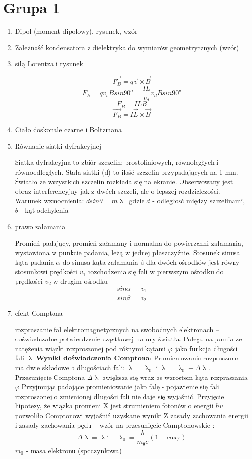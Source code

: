 \documentclass[12pt,a4paper]{article}
\begin{document}
	
	\section{Grupa 1}
	\begin {enumerate}
	
	
	\item Dipol (moment dipolowy), rysunek, wzór
	
	\item Zależność kondensatora z dielektryka do wymiarów geometrycznych (wzór)
	
	\item siłą Lorentza i rysunek
	
	$$\vec{F_B}=q\vec{v}\times\vec{B}$$
	$$F_B = qv_dBsin90^o=\frac{IL}{v_d}v_dBsin90^o$$
	$$F_B=ILB$$
	$$\vec{F_B}=I\vec{L}\times\vec{B}$$
	
	\item Ciało doskonale czarne i Boltzmana
	
	\item Równanie siatki dyfrakcyjnej
	
	Siatka dyfrakcyjna to zbiór szczelin: prostoliniowych, równoległych i równoodległych. Stała siatki (d) to ilość szczelin przypadających na 1 mm. Światło ze wszystkich szczelin rozkłada się na ekranie. Obserwowany jest obraz interferencyjny jak z dwóch szczeli, ale o lepszej rozdzielczości.
	Warunek wzmocnienia: $dsin\theta =m\uplambda$, gdzie $d$ - odległość między szczelinami, $\theta$ - kąt odchylenia
	
	\item prawo załamania
	
	Promień padający, promień załamany i normalna do powierzchni załamania, wystawiona w punkcie padania, leżą w jednej płaszczyźnie. Stosunek sinusa kąta padania $\alpha$ do sinusa kąta załamania $\beta$ dla dwóch ośrodków jest równy stosunkowi prędkości $v_1$ rozchodzenia się fali w pierwszym ośrodku do prędkości $v_2$ w drugim ośrodku
	$$\frac{sin\alpha}{sin\beta}=\frac{v_1}{v_2}$$
	
	\item efekt Comptona
	
	rozpraszanie fal elektromagnetycznych na swobodnych elektronach -- doświadczalne potwierdzenie cząstkowej natury światła. Polega na pomiarze natężenia wiązki rozproszonej pod różnymi kątami $\varphi$ jako funkcja długości fali $\uplambda$
	\textbf{Wyniki doświadczenia Comptona}: Promieniowanie rozproszone ma dwie składowe o długościach fali: $\uplambda = \uplambda_0$ i $\uplambda = \uplambda_0 +\Delta\uplambda$. Przesunięcie Comptona $\Delta\uplambda$ zwiększa się wraz ze wzrostem kąta rozpraszania $\varphi$
	Przyjmując padające promieniowanie jako falę - pojawienie się fali rozproszonej o zmienionej długości fali nie daje się wyjaśnić. Przyjęcie hipotezy, że wiązka promieni X jest strumieniem fotonów o energii $hv$ pozwoliło Comptonowi wyjaśnić uzyskane wyniki
	Z zasady zachowania energii i zasady zachowania pędu -- wzór na przesunięcie Camptonowskie :
	$$\Delta\uplambda = \uplambda' -\uplambda_0 = \frac{h}{m_0c}\left(1-cos\varphi\right)$$
	$m_0$ - masa elektronu (spoczynkowa)
	

\end{enumerate}
\end{document}

